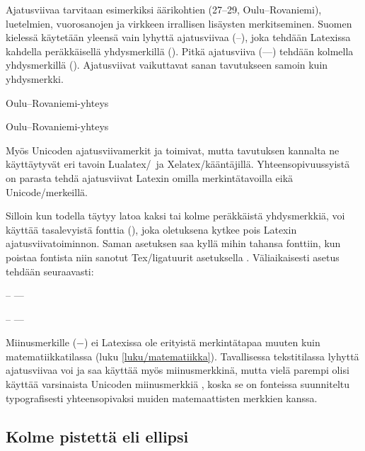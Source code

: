 Ajatusviivaa tarvitaan esimerkiksi äärikohtien (27--29,
Oulu--Rova\-niemi), luetelmien, vuorosanojen ja virkkeen irrallisen
lisäysten merkitseminen. Suomen kielessä käytetään yleensä vain lyhyttä
ajatusviivaa \mbox{(--)}, joka tehdään Latexissa kahdella peräkkäisellä
yhdysmerkillä (\koodim{--}). Pitkä ajatusviiva \mbox{(---)} tehdään
kolmella yhdysmerkillä (\koodim{---}). Ajatusviivat vaikuttavat sanan
tavutukseen samoin kuin yhdysmerkki.

\begin{koodilohkosis}
Oulu--Rovaniemi-yhteys
\end{koodilohkosis}

\begin{tulossis}
  Oulu--Rovaniemi-yhteys
\end{tulossis}

\noindent
Myös Unicoden ajatusviivamerkit  ja
 toimivat, mutta tavutuksen kannalta ne
käyttäytyvät eri tavoin Lualatex\-/\ ja Xelatex\-/kääntäjillä.
Yhteensopivuussyistä on parasta tehdä ajatusviivat Latexin omilla
merkintätavoilla eikä Unicode\-/merkeillä.

Silloin kun todella täytyy latoa kaksi tai kolme peräkkäistä
yhdysmerkkiä, voi käyttää tasalevyistä fonttia
(\komentoarg{--}), joka oletuksena kytkee pois Latexin
ajatusviivatoiminnon. Saman asetuksen saa kyllä mihin tahansa fonttiin,
kun poistaa fontista niin sanotut Tex\-/ligatuurit asetuksella
. Väliaikaisesti asetus tehdään
seuraavasti:

\begin{koodilohkosis}
{ -- ---}
\end{koodilohkosis}

\begin{tulossis}
  { -- ---}
\end{tulossis}

\noindent
Miinusmerkille (−) ei Latexissa ole erityistä merkintätapaa muuten kuin
matematiikkatilassa (luku \ref{luku/matematiikka}). Tavallisessa
tekstitilassa lyhyttä ajatusviivaa voi ja saa käyttää myös
miinusmerkkinä, mutta vielä parempi olisi käyttää varsinaista Unicoden
miinusmerkkiä , koska se on fonteissa
suunniteltu typografisesti yhteensopivaksi muiden matemaattisten
merkkien kanssa.

\subsection{Kolme pistettä eli ellipsi}

